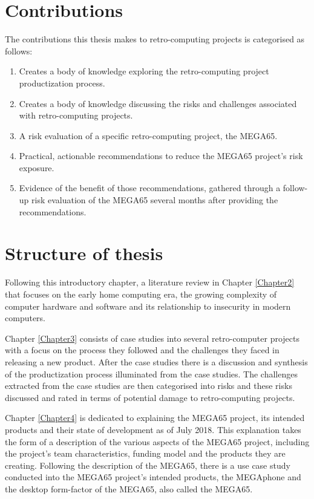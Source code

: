 \section{Contributions}
\label{contributions}
The contributions this thesis makes to retro-computing projects is categorised as follows:
\begin{enumerate}
\item Creates a body of knowledge exploring the retro-computing project productization process.
\item Creates a body of knowledge discussing the risks and challenges associated with retro-computing projects.
\item A risk evaluation of a specific retro-computing project, the MEGA65.
\item Practical, actionable recommendations to reduce the MEGA65 project's risk exposure.
\item Evidence of the benefit of those recommendations, gathered through a follow-up risk evaluation of the MEGA65 several months after providing the recommendations.
\end{enumerate}

\section{Structure of thesis}
Following this introductory chapter, a literature review in Chapter \ref{Chapter2} that focuses on the early home computing era, the growing complexity of computer hardware and software and its relationship to insecurity in modern computers. 

Chapter \ref{Chapter3} consists of case studies into several retro-computer projects with a focus on the process they followed and the challenges they faced in releasing a new product. After the case studies there is a discussion and synthesis of the productization process illuminated from the case studies. The challenges extracted from the case studies are then categorised into risks and these risks discussed and rated in terms of potential damage to retro-computing projects. 

Chapter \ref{Chapter4} is dedicated to explaining the MEGA65 project, its intended products and their state of development as of July 2018. This explanation takes the form of a description of the various aspects of the MEGA65 project, including the project's team characteristics, funding model and the products they are creating. Following the description of the MEGA65, there is a use case study conducted into the MEGA65 project's intended products, the MEGAphone and the desktop form-factor of the MEGA65, also called the MEGA65. 

